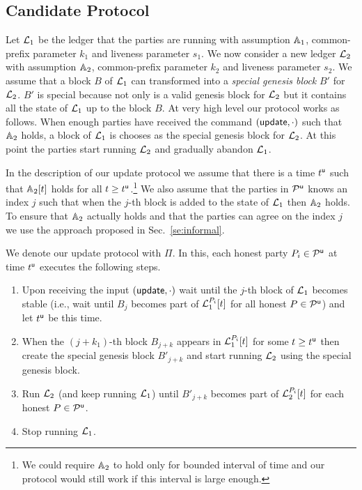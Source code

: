 \subsection{Candidate Protocol}

Let $\mathcal{L}_1$ be the ledger that the parties are running with assumption $\mathbb{A}_1$, common-prefix parameter $k_1$ 
and  liveness parameter $s_1$. 
We now consider a new ledger $\mathcal{L}_2$ with assumption $\mathbb{A}_2$, common-prefix parameter $k_2$ and  liveness parameter $s_2$.
We assume that a block $B$ of $\mathcal{L}_1$ can transformed into a \emph{special genesis block} $B'$ for $\mathcal{L}_2$. $B'$ is special because not only
is a valid genesis block for $\mathcal{L}_2$ but it contains all the state of $\mathcal{L}_1$ up to the block $B$. 
At very high level our protocol works as follows. When enough parties have received the command $(\mathsf{update},\cdot)$ such that $\mathbb{A}_2$ holds,
a block of $\mathcal{L}_1$ is chooses as the special genesis block for $\mathcal{L}_2$. At this point the parties start running $\mathcal{L}_2$ and gradually abandon 
$\mathcal{L}_1$.

In the description of our update protocol we assume that there is a time $t^{\mathsf{u}}$ such that $\mathbb{A}_2[t]$ holds for all $t\geq t^{\mathsf{u}}$.\footnote{We could require $\mathbb{A}_2$ to
hold only for bounded interval of time and our protocol would still work if this interval is large enough.}
We also assume that the parties in $\mathcal{P}^\mathsf{u}$ knows an index $j$ such that when the $j$-th block is added to the state of $\mathcal{L}_1$ then $\mathbb{A}_2$ holds. 
To ensure that $\mathbb{A}_2$ actually holds and that the parties can agree on the index $j$ we use the approach proposed in Sec.~\ref{se:informal}.

We denote our update protocol with $\Pi$. In this, each honest party $P_i\in\mathcal{P}^\mathsf{u}$ at time $t^{\mathsf{u}}$ executes the following steps.

\begin{enumerate}
	\item Upon receiving the input $(\mathsf{update}, \cdot)$ wait until the $j$-th block of $\mathcal{L}_1$ becomes stable (i.e., wait until $B_{j}$ becomes part of $\mathcal{L}_1^{P_i}[t]$ 
	for all honest $P\in\mathcal{P}^\mathsf{u}$) and let $t^{\mathsf{u}}$ be this time.
	\item When the $(j+k_1)$-th block $B_{j+k}$ appears in $\mathcal{L}_1^{P_i}[t]$ for some $t\geq t^{\mathsf{u}}$ then create the special genesis block $B'_{j+k}$
	and start running $\mathcal{L}_2$ using the special genesis block.
	\item Run $\mathcal{L}_2$ (and keep running $\mathcal{L}_1$) until $B'_{j+k}$ becomes part of $\mathcal{L}_2^{P_i}[t]$ 
	for each honest $P\in\mathcal{P}^\mathsf{u}$.
	\item Stop running $\mathcal{L}_1$.
\end{enumerate}




